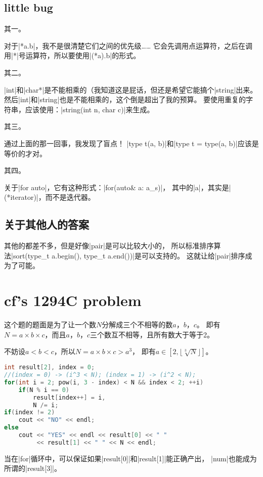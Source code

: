 \subsection{little bug}
其一。

对于\vb|*a.b|，我不是很清楚它们之间的优先级\ldots\ldots
它会先调用点运算符，之后在调用\vb|*|号运算符，所以要使用\vb|(*a).b|的形式。

其二。

\vb|int|和\vb|char*|是不能相乘的（我知道这是屁话，但还是希望它能搞个\vb|string|出来。
然后\vb|int|和\vb|string|也是不能相乘的，这个倒是超出了我的预算。
要使用重复的字符串，应该使用：\vb|string(int n, char c)|来生成。

其三。

通过上面的那一回事，我发现了盲点！
\vb|type t(a, b)|和\vb|type t = type(a, b)|应该是等价的才对。

其四。

关于\vb|for auto|，它有这种形式：\vb|for(auto& a: a_s)|，
其中的\vb|a|，其实是\vb|(*iterator)|，而不是迭代器。

\subsection{关于其他人的答案}
其他的都差不多，但是好像\vb|pair|是可以比较大小的，
所以标准排序算法\vb|sort(type_t a.begin(), type_t a.end())|是可以支持的。
这就让给\vb|pair|排序成为了可能。


\section{cf's 1294C problem}

这个题的题面是为了让一个数$N$分解成三个不相等的数$a$，$b$，$c$。
即有$N=a\times b\times c$，而且$a$，$b$，$c$三个数互不相等，且所有数大于等于2。

不妨设$a < b < c$，所以$N=a\times b\times c>a^3$，
即有$a\in[2,\lfloor\sqrt[3]{N}\rfloor]$。

\begin{lstlisting}[language=C++]
int result[2], index = 0;
//(index = 0) -> (i^3 < N); (index = 1) -> (i^2 < N);
for(int i = 2; pow(i, 3 - index) < N && index < 2; ++i)
    if(N % i == 0)
        result[index++] = i,
        N /= i;
if(index != 2)
    cout << "NO" << endl;
else
    cout << "YES" << endl << result[0] << " "
         << result[1] << " " << N << endl;
\end{lstlisting}

当在\vb|for|循环中，可以保证如果\vb|result[0]|和\vb|result[1]|能正确产出，
\vb|num|也能成为所谓的\vb|result[3]|。

